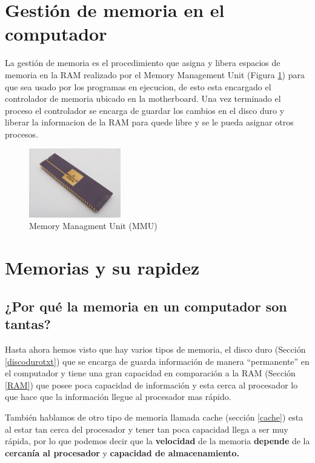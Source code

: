\documentclass{article}
\begin{document}
\section{Gestión de memoria en el computador}

La gestión de memoria es el procedimiento que asigna y libera espacios de memoria en la RAM realizado por el Memory Management Unit (Figura \ref{fig:MMU})  para que sea usado por los programas en ejecucion, de esto esta encargado el controlador de memoria  ubicado en la motherboard.
\cite{UdManizales} Una vez terminado el proceso el controlador se encarga de guardar los cambios en el disco duro y liberar la informacion de la RAM para quede libre y se le pueda asignar otros procesos.

\begin{figure}[h]
\includegraphics[width=4cm]{Images/MMU.jpg}
\centering
\caption{Memory Managment Unit (MMU)}
\label{fig:MMU}
\end{figure}

\section{Memorias y su rapidez}

\subsection{¿Por qué la memoria en un computador son tantas?}
Hasta ahora hemos visto que hay varios tipos de memoria, el disco duro (Sección \ref{discodurotxt}) que se encarga de guarda información de manera ``permanente''
en el computador y tiene una gran capacidad en comparación a la RAM (Sección \ref{RAM}) que posee poca capacidad de información y esta cerca al procesador lo que hace que la información llegue al procesador mas rápido.

\vspace{0.5cm}

También hablamos de otro tipo de memoria llamada cache (sección \ref{cache}) esta al estar tan cerca del procesador y tener tan poca capacidad llega a ser muy rápida, por lo que podemos decir que la \textbf{velocidad} de la memoria \textbf{depende} de la \textbf{cercanía al procesador} y \textbf{capacidad de almacenamiento.}
\end{document}
